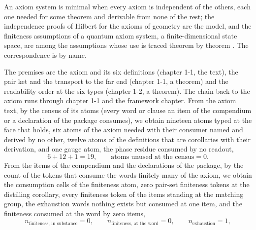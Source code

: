 \begin{chbridge}
An axiom system is minimal when every axiom is independent of the others, each one needed for some theorem and derivable from none of the rest; the independence proofs of Hilbert for the axioms of geometry are the model, and the finiteness assumptions of a quantum axiom system, a finite-dimensional state space, are among the assumptions whose use is traced theorem by theorem \cite{Hilbert1899,Mackey1963}. The correspondence is by name.
\end{chbridge}
\begin{chproof}[exact]
The premises are the axiom and its six definitions (chapter 1-1, the text), the pair ket and the transport to the far end (chapter 1-1, a theorem) and the readability order at the six types (chapter 1-2, a theorem). The chain back to the axiom runs through chapter 1-1 and the framework chapter. From the axiom text, by the census of its atoms (every word or clause an item of the compendium or a declaration of the package consumes), we obtain nineteen atoms typed at the face that holds, six atoms of the axiom needed with their consumer named and derived by no other, twelve atoms of the definitions that are corollaries with their derivation, and one gauge atom, the phase residue consumed by no readout,
\begin{equation}
6 + 12 + 1 = 19,\qquad \text{atoms unused at the census} = 0 .
\end{equation}
From the items of the compendium and the declarations of the package, by the count of the tokens that consume the words finitely many of the axiom, we obtain the consumption cells of the finiteness atom, zero pair-set finiteness tokens at the distilling corollary, every finiteness token of the items standing at the matching group, the exhaustion words nothing exists but consumed at one item, and the finiteness consumed at the word by zero items,
\begin{equation}
n_{\text{finiteness, in substance}} = 0,\qquad n_{\text{finiteness, at the word}} = 0,\qquad n_{\text{exhaustion}} = 1 ,
\end{equation}

\end{chproof}

